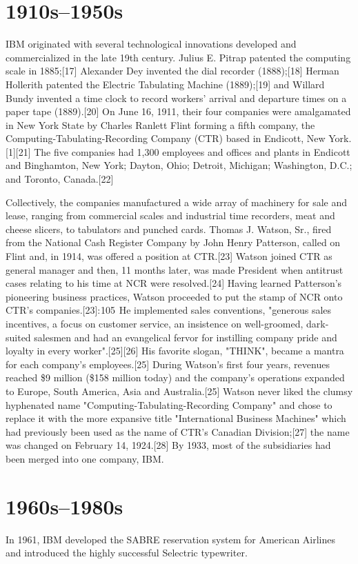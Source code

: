 \documentclass[11pt,a4paper]{article}
\begin{document}
\section{1910s–1950s}

IBM originated with several technological innovations developed and commercialized in the late 19th century. Julius E. Pitrap patented the computing scale in 1885;[17] Alexander Dey invented the dial recorder (1888);[18] Herman Hollerith patented the Electric Tabulating Machine (1889);[19] and Willard Bundy invented a time clock to record workers' arrival and departure times on a paper tape (1889).[20] On June 16, 1911, their four companies were amalgamated in New York State by Charles Ranlett Flint forming a fifth company, the Computing-Tabulating-Recording Company (CTR) based in Endicott, New York.[1][21] The five companies had 1,300 employees and offices and plants in Endicott and Binghamton, New York; Dayton, Ohio; Detroit, Michigan; Washington, D.C.; and Toronto, Canada.[22]

Collectively, the companies manufactured a wide array of machinery for sale and lease, ranging from commercial scales and industrial time recorders, meat and cheese slicers, to tabulators and punched cards. Thomas J. Watson, Sr., fired from the National Cash Register Company by John Henry Patterson, called on Flint and, in 1914, was offered a position at CTR.[23] Watson joined CTR as general manager and then, 11 months later, was made President when antitrust cases relating to his time at NCR were resolved.[24] Having learned Patterson's pioneering business practices, Watson proceeded to put the stamp of NCR onto CTR's companies.[23]: 105  He implemented sales conventions, "generous sales incentives, a focus on customer service, an insistence on well-groomed, dark-suited salesmen and had an evangelical fervor for instilling company pride and loyalty in every worker".[25][26] His favorite slogan, "THINK", became a mantra for each company's employees.[25] During Watson's first four years, revenues reached \$9 million (\$158 million today) and the company's operations expanded to Europe, South America, Asia and Australia.[25] Watson never liked the clumsy hyphenated name "Computing-Tabulating-Recording Company" and chose to replace it with the more expansive title "International Business Machines" which had previously been used as the name of CTR's Canadian Division;[27] the name was changed on February 14, 1924.[28] By 1933, most of the subsidiaries had been merged into one company, IBM.

\section{1960s–1980s}

In 1961, IBM developed the SABRE reservation system for American Airlines and introduced the highly successful Selectric typewriter.
\end{document}
